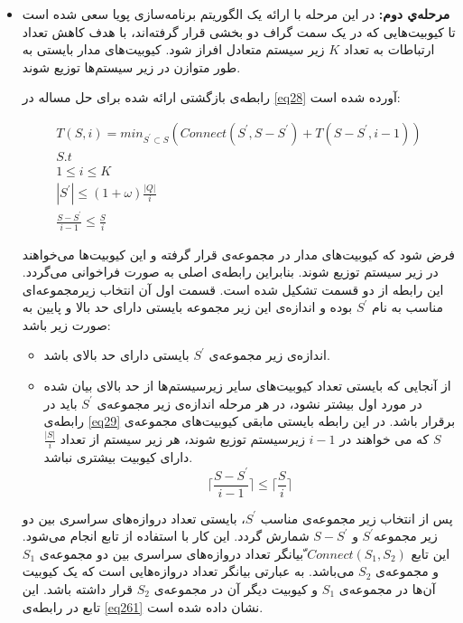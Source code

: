 \begin{itemize}
\item
\textbf{مرحله‌ي دوم:}
در این مرحله با ارائه یک الگوریتم برنامه‌سازی پویا سعی شده است تا کیوبیت‌هایی که در یک سمت گراف دو بخشی قرار گرفته‌اند، با هدف کاهش تعداد ارتباطات به تعداد $K$ زیر سیستم متعادل افراز شود. کیوبیت‌های مدار بایستی به طور متوازن در زیر سیستم‌ها توزیع شوند. 


رابطه‌ی بازگشتی ارائه شده برای حل مساله در \eqref{eq28} آورده شده است:
\begin{center}
\begin{equation}
\begin{split}
T(S,i)=min_{S^{'} \subset S }( Connect(S^{'}, S-S^{'})+T(S-S^{'},i-1))\\
S.t\\
   1\leq i\leq K\\
|S^{'}| \leq (1+\omega)\frac{|Q|}{i}\\
\frac{S-S^{'}}{i-1}\leq \frac{S}{i}
\end{split}
\label{eq28}
\end{equation}
\end{center}
فرض شود که کیوبیت‌های مدار در مجموعه‌ی   قرار گرفته و این کیوبیت‌ها می‌خواهند در  زیر سیستم توزیع شوند. بنابراین رابطه‌ی اصلی به صورت  فراخوانی می‌گردد. این رابطه از دو قسمت تشکیل شده است. قسمت اول آن انتخاب زیرمجموعه‌ای مناسب به نام $S^{'}$ بوده و اندازه‌ی این زیر مجموعه بایستی دارای حد بالا و پایین به صورت زیر باشد:
\begin{itemize}
\item
اندازه‌ی زیر مجموعه‌ی $S^{'}$ بایستی دارای حد بالای  باشد.
\item
از آنجایی که بایستی تعداد کیوبیت‌های سایر زیرسیستم‌ها از حد بالای بیان شده در مورد اول بیشتر نشود، در هر مرحله اندازه‌ی زیر مجموعه‌ی $S^{'}$ باید در رابطه‌ی \ref{eq29} برقرار باشد. در این رابطه بایستی مابقی کیوبیت‌های مجموعه‌ی $S$ که می خواهند در $i-1 $ زیرسیستم توزیع شوند، هر زیر سیستم از تعداد
 $\frac{|S|} {i}$ دارای کیوبیت بیشتری نباشد. 
\begin{equation}
\lceil{\frac{S-S^{'}}{i-1}}\rceil\leq \lceil{\frac{S}{i}}\rceil
\label{eq29}
\end{equation}

\end{itemize}

پس از انتخاب زیر مجموعه‌‌ی مناسب $S^{'}$، بایستی تعداد دروازه‌های سراسری بین دو زیر مجموعه‌$S^{'}$ و $S-S^{'} $ شمارش گردد. این کار با استفاده از تابع  انجام می‌شود. این تابع $Connect(S_{1},S_{2})$ ّبیانگر تعداد دروازه‌های سراسری بین دو مجموعه‌ی $S_{1}$ و مجموعه‌ی $S_{2}$ می‌باشد. به عبارتی بیانگر تعداد دروازه‌هایی است که یک کیوبیت آن‌ها در مجموعه‌ی $S_{1}$ و کیوبیت دیگر آن در مجموعه‌ی $S_{2}$  قرار داشته باشد. این تابع در رابطه‌ی \eqref{eq261} نشان داده شده است.


\end{itemize}
